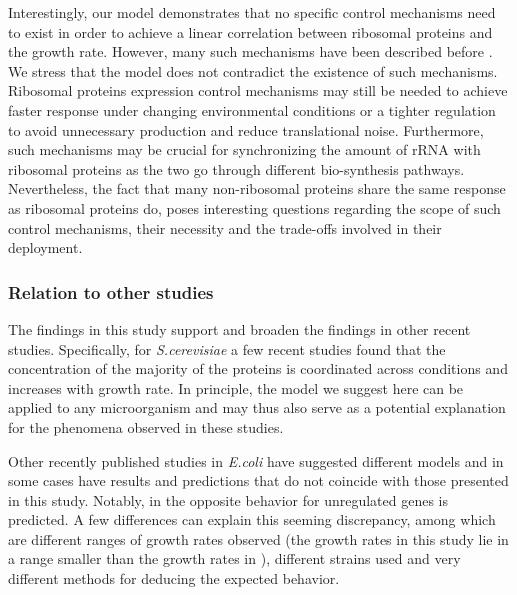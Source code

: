 \documentclass[notitlepage]{article}
\begin{document}
Interestingly, our model demonstrates that no specific control mechanisms need to exist in order to achieve a linear correlation between ribosomal proteins and the growth rate.
However, many such mechanisms have been described before \cite{Nomura1984}.
We stress that the model does not contradict the existence of such mechanisms.
Ribosomal proteins expression control mechanisms may still be needed to achieve faster response under changing environmental conditions or a tighter regulation to avoid unnecessary production and reduce translational noise.
Furthermore, such mechanisms may be crucial for synchronizing the amount of rRNA with ribosomal proteins as the two go through different bio-synthesis pathways.
Nevertheless, the fact that many non-ribosomal proteins share the same response as ribosomal proteins do, poses interesting questions regarding the scope of such control mechanisms, their necessity and the trade-offs involved in their deployment.

\subsubsection{Relation to other studies}
The findings in this study support and broaden the findings in other recent studies.
Specifically, for \emph{S.cerevisiae} a few recent studies found that the concentration of the majority of the proteins is coordinated across conditions \cite{Keren2013a, Gasch2000, Brauer2008a} and increases with growth rate. %
In principle, the model we suggest here can be applied to any microorganism and may thus also serve as a potential explanation for the phenomena observed in these studies.

Other recently published studies in \emph{E.coli} have suggested different models and in some cases have results  and predictions that do not coincide with those presented in this study.
Notably, in \cite{Klumpp2009a} the opposite behavior for unregulated genes is predicted.
A few differences can explain this seeming discrepancy, among which are different ranges of growth rates observed (the growth rates in this study lie in a range smaller than the growth rates in \cite{Klumpp2009a}), different strains used and very different methods for deducing the expected behavior. %
\end{document}
